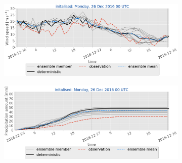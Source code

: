 \begin{figure}
    \begin{subfigure}[b]{0.49\textwidth}
    	\includegraphics[trim={0.cm 3.6cm 0cm 0cm},clip,
    width=\textwidth]{./fig_sfc_ws/20161226_00}
    	\caption{}\label{fig:res:sfc_ws26}
    \end{subfigure}
    
    \begin{subfigure}[b]{0.49\textwidth}
    	\includegraphics[trim={0.cm 3.6cm 0cm 0cm},clip,
    width=\textwidth]{./fig_sfc_precip/20161226_00}
    	\caption{}\label{fig:res:sfc_precip26}
    \end{subfigure}
    

\end{figure}
